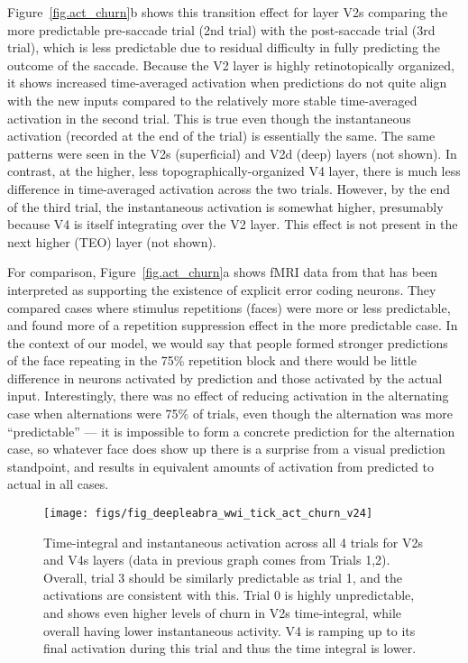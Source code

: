 \documentclass[11pt,twoside]{article}
\newif\myifpdf
\begin{document}
Figure~\ref{fig.act_churn}b shows this transition effect for layer V2s comparing the more predictable pre-saccade trial (2nd trial) with the post-saccade trial (3rd trial), which is less predictable due to residual difficulty in fully predicting the outcome of the saccade.  Because the V2 layer is highly retinotopically organized, it shows increased time-averaged activation when predictions do not quite align with the new inputs compared to the relatively more stable time-averaged activation in the second trial.  This is true even though the instantaneous activation (recorded at the end of the trial) is essentially the same.  The same patterns were seen in the V2s (superficial) and V2d (deep) layers (not shown).  In contrast, at the higher, less topographically-organized V4 layer, there is much less difference in time-averaged activation across the two trials.  However, by the end of the third trial, the instantaneous activation is somewhat higher, presumably because V4 is itself integrating over the V2 layer.  This effect is not present in the next higher (TEO) layer (not shown).  

For comparison, Figure~\ref{fig.act_churn}a shows fMRI data from  that has been interpreted as supporting the existence of explicit error coding neurons.  They compared cases where stimulus repetitions (faces) were more or less predictable, and found more of a repetition suppression effect in the more predictable case.  In the context of our model, we would say that people formed stronger predictions of the face repeating in the 75\% repetition block and there would be little difference in neurons activated by prediction and those activated by the actual input.  Interestingly, there was no effect of reducing activation in the alternating case when alternations were 75\% of trials, even though the alternation was more ``predictable'' --- it is impossible to form a concrete prediction for the alternation case, so whatever face does show up there is a surprise from a visual prediction standpoint, and results in equivalent amounts of activation from predicted to actual in all cases.

\begin{figure}
  \centering\texttt{[image: figs/fig\_deepleabra\_wwi\_tick\_act\_churn\_v24]}
  \caption{\footnotesize Time-integral and instantaneous activation across all 4 trials for V2s and V4s layers (data in previous graph comes from Trials 1,2).  Overall, trial 3 should be similarly predictable as trial 1, and the activations are consistent with this.  Trial 0 is highly unpredictable, and shows even higher levels of churn in V2s time-integral, while overall having lower instantaneous activity.  V4 is ramping up to its final activation during this trial and thus the time integral is lower.}
  \label{fig.act_churn_all}
\end{figure}
\end{document}
